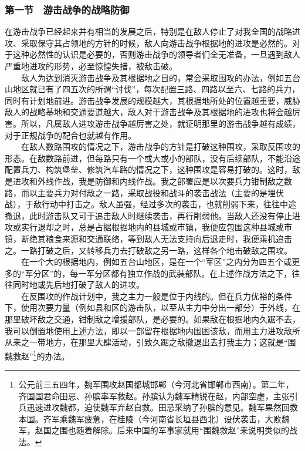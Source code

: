 \documentclass[cn,11pt,chinese]{elegantbook}
\def\myformat#1{\hfil\hfil #1}
\begin{document}
\subsubsection*{\myformat{第一节　游击战争的战略防御}}
在游击战争已经起来并有相当的发展之后，特别是在敌人停止了对我全国的战略进攻、采取保守其占领地的方针的时候，敌人向游击战争根据地的进攻是必然的。对于这种必然性的认识是必要的，否则游击战争的领导者们全无准备，一旦遇到敌人严重地进攻的形势，必至惊惶失措，被敌击破。\\
　　敌人为达到消灭游击战争及其根据地之目的，常会采取围攻的办法，例如五台山地区就已有了四五次的所谓“讨伐”，每次配置三路、四路以至六、七路的兵力，同时有计划地前进。游击战争发展的规模越大，其根据地所处的位置越重要，威胁敌人的战略基地和交通要道越大，敌人对于游击战争及其根据地的进攻也将会越厉害。所以，凡属敌人进攻游击战争越厉害之处，就证明那里的游击战争越有成绩，对于正规战争的配合也就越有作用。\\
　　在敌人数路围攻的情况之下，游击战争的方针是打破这种围攻，采取反围攻的形态。在敌数路前进，但每路只有一个或大或小的部队，没有后续部队，不能沿途配置兵力、构筑堡垒、修筑汽车路的情况之下，这种围攻是容易打破的。这时，敌是进攻和外线作战，我是防御和内线作战。我之部署应是以次要兵力钳制敌之数路，而以主要兵力对付敌之一路，采取战役和战斗的袭击战法（主要的是埋伏战），于敌行动中打击之。敌人虽强，经过多次的袭击，也就削弱下来，往往中途撤退，此时游击队又可于追击敌人时继续袭击，再行削弱他。当敌人还没有停止进攻或实行退却之时，总是占据根据地内的县城或市镇，我便应包围这种县城或市镇，断绝其粮食来源和交通联络，等到敌人无法支持向后退走时，我便乘机追击之。一路打破之后，又转移兵力去打破敌之另一路，这样各个地击破敌之围攻。\\
　　在一个大的根据地内，例如五台山地区，是在一个“军区”之内分为四五个或更多的“军分区”的，每一军分区都有独立作战的武装部队。在上述作战方法之下，往往同时地或先后地打破了敌人的进攻。\\
　　在反围攻的作战计划中，我之主力一般是位于内线的。但在兵力优裕的条件下，使用次要力量（例如县和区的游击队，以至从主力中分出一部分）于外线，在那里破坏敌之交通，钳制敌之增援部队，是必要的。如果敌在根据地内久踞不去，我可以倒置地使用上述方法，即以一部留在根据地内围困该敌，而用主力进攻敌所从来之一带地方，在那里大肆活动，引致久踞之敌撤退出去打我主力；这就是“围魏救赵”\footnote[9]{ 公元前三五四年，魏军围攻赵国都城邯郸（今河北省邯郸市西南）。第二年，齐国国君命田忌、孙膑率军救赵。孙膑认为魏军精锐在赵，内部空虚，主张引兵迅速进攻魏都，迫使魏军弃赵自救。田忌采纳了孙膑的意见。魏军果然回救本国。齐军乘魏军疲惫，在桂陵（今河南省长垣县西北）设伏袭击，大败魏军，赵国之围也随着解除。后来中国的军事家就用“围魏救赵”来说明类似的战法。}的办法。\\
\end{document}

